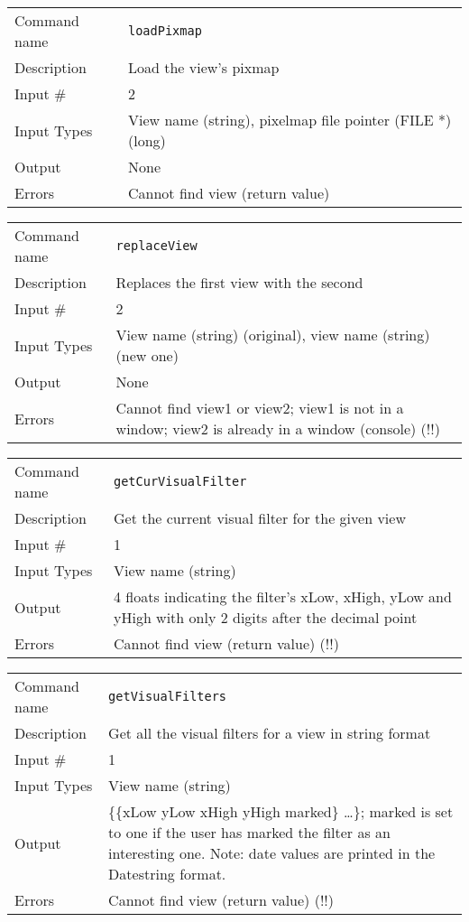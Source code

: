 \bigskip

\noindent
\begin{tabular}{l|p{5in}}
\hline
Command name & {\tt loadPixmap} \\
Description  & Load the view's pixmap \\
Input \#     & 2 \\
Input Types  & View name (string), pixelmap file pointer (FILE *) (long) \\
Output       & None \\
Errors       & Cannot find view (return value) \\
\hline
\end{tabular}

\bigskip

\noindent
\begin{tabular}{l|p{5in}}
\hline
Command name & {\tt replaceView} \\
Description  & Replaces the first view with the second \\
Input \#     & 2 \\
Input Types  & View name (string) (original), view name (string) (new one) \\
Output       & None \\
Errors       & Cannot find view1 or view2; view1 is not in a window;
               view2 is already in a window (console) (!!) \\
\hline
\end{tabular}

\bigskip

\noindent
\begin{tabular}{l|p{5in}}
\hline
Command name & {\tt getCurVisualFilter} \\
Description  & Get the current visual filter for the given view \\
Input \#     & 1 \\
Input Types  & View name (string) \\
Output       & 4 floats indicating the filter's xLow, xHigh, yLow and yHigh
               with only 2 digits after the decimal point \\
Errors       & Cannot find view (return value) (!!) \\
\hline
\end{tabular}

\bigskip

\noindent
\begin{tabular}{l|p{5in}}
\hline
Command name & {\tt getVisualFilters} \\
Description  & Get all the visual filters for a view in string format \\
Input \#     & 1 \\
Input Types  & View name (string) \\
Output       & \{\{xLow yLow xHigh yHigh marked\} \ldots \};
               marked is set to one if the user has marked the filter as
               an interesting one. Note: date values are printed in the
               Datestring format. \\
Errors       & Cannot find view (return value) (!!) \\
\hline
\end{tabular}

